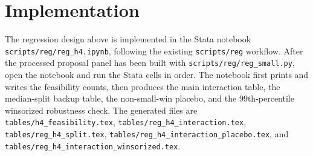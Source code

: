 \documentclass[11pt]{article}
\begin{document}
\section*{Implementation}

The regression design above is implemented in the Stata notebook \texttt{scripts/reg/reg\_h4.ipynb}, following the existing \texttt{scripts/reg} workflow. After the processed proposal panel has been built with \texttt{scripts/reg/reg\_small.py}, open the notebook and run the Stata cells in order. The notebook first prints and writes the feasibility counts, then produces the main interaction table, the median-split backup table, the non-small-win placebo, and the 99th-percentile winsorized robustness check. The generated files are \texttt{tables/h4\_feasibility.tex}, \texttt{tables/reg\_h4\_interaction.tex}, \texttt{tables/reg\_h4\_split.tex}, \texttt{tables/reg\_h4\_interaction\_placebo.tex}, and \texttt{tables/reg\_h4\_interaction\_winsorized.tex}.
\end{document}
